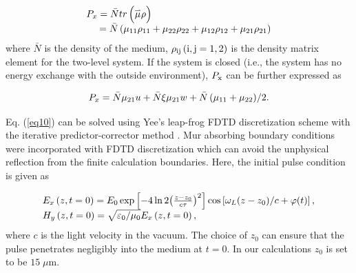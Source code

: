 \documentclass[10pt,letterpaper]{article}
\begin{document}
\begin{equation}
\begin{array}{l}
{P_x} =   \bar{N}tr\left( {\mathord{\buildrel{\lower3pt\hbox{$\scriptscriptstyle\rightharpoonup$}}
		\over \mu } \rho } \right)\\
\;\;\;\;\: =   \bar{N}\left( {{\mu _{11}}{\rho _{11}} + {\mu _{22}}{\rho _{22}} + {\mu _{12}}{\rho _{12}} + {\mu _{21}}{\rho _{21}}} \right)
\end{array}
\label{eq11}
\end{equation}
where $ \bar{N} $ is the density of the medium, ${\rho _{\rm{ij}}}\left( {\rm{i,j} = 1, 2} \right)$  is the density matrix element for the two-level system. If the system is closed (i.e., the system has no energy exchange with the outside environment),  $ P_{\rm{x}} $ can be further expressed as

\begin{equation}
{P_x} =   \bar{N}{\mu _{21}}u + \bar{N}\xi {\mu _{21}}w + {{\bar{N}\left( {{\mu _{11}} + {\mu _{22}}} \right)} \mathord{\left/
		{\vphantom {{N\left( {{\mu _{11}} + {\mu _{22}}} \right)} 2}} \right.
		\kern-\nulldelimiterspace} 2}.
\label{eq12}
\end{equation}

Eq. (\ref{eq10}) can be solved using Yee's leap-frog FDTD discretization scheme \cite{Yee} with the iterative predictor-corrector method \cite{Ziolkowski-Two-Level-Method-PRA-1995}. Mur absorbing boundary conditions \cite{Mur-Absorption} were incorporated with FDTD discretization which can avoid the unphysical reflection from the finite calculation boundaries. Here, the initial pulse condition is given as

\begin{equation}
\begin{array}{l}
{E_x}\left( {z,t = 0} \right) = {E_0}\exp \left[ { - 4\ln 2{{\left( {\frac{{z - {z_0}}}{{c\tau }}} \right)}^2}} \right]\cos \left[ {{\omega _L}{{\left( {z - {z_0}} \right)} \mathord{\left/
			{\vphantom {{\left( {z - {z_0}} \right)} c}} \right.
			\kern-\nulldelimiterspace} c}}  + \varphi (t)\right],\\
{H_y}\left( {z,t = 0} \right) = \sqrt {{{{\varepsilon _0}} \mathord{\left/
			{\vphantom {{{\varepsilon _0}} {{\mu _0}}}} \right.
			\kern-\nulldelimiterspace} {{\mu _0}}}} {E_x}\left( {z,t = 0} \right),
\end{array}
\label{eq13}
\end{equation}
where $ c $ is the light velocity in the vacuum. The choice of $ z_{0} $ can ensure that the pulse penetrates negligibly into the medium at $ t=0 $. In our calculations $ z_{0} $ is set to be $15\;\mu$m.
\end{document}
